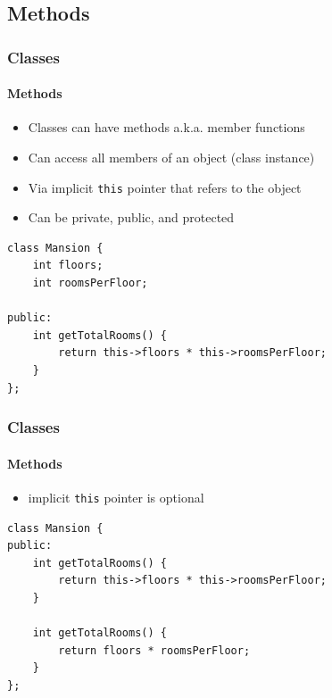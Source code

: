 \documentclass[table]{beamer}
\newcommand{\declarelesson}{\textbf{\color{themegreen}{Lesson:}} }
\begin{document}

\subsection{Methods}
\frame{\subsectionpage}

\begin{frame}[fragile]
    \frametitle{\declarelesson Classes }
    \framesubtitle{Methods}
    \begin{itemize}
        \item Classes can have methods a.k.a. member functions
        \item Can access all members of an object (class instance)
        \item Via implicit \texttt{this} pointer that refers to the object
        \item Can be private, public, and protected 
    \end{itemize}
    \begin{lstlisting}[title=Writing a method]
class Mansion {
    int floors;
    int roomsPerFloor;

public:
    int getTotalRooms() {
        return this->floors * this->roomsPerFloor;
    }
};
    \end{lstlisting}
\end{frame}

\begin{frame}[fragile]
    \frametitle{\declarelesson Classes }
    \framesubtitle{Methods}
    \begin{itemize}
        \item implicit \texttt{this} pointer is optional
    \end{itemize}
    \begin{lstlisting}[title=Equivalent]
class Mansion {
public:
    int getTotalRooms() {
        return this->floors * this->roomsPerFloor;
    }

    int getTotalRooms() {
        return floors * roomsPerFloor;
    }
};
    \end{lstlisting}
\end{frame}
\end{document}
